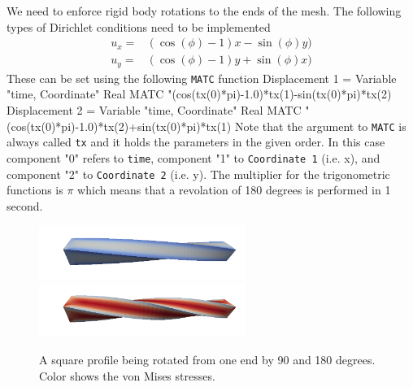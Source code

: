 We need to enforce rigid body rotations to the ends of the mesh. The following
types of Dirichlet conditions need to be implemented
\begin{equation}
  \begin{array}{ll}
    u_x = & ( \cos(\phi) - 1)x - \sin(\phi)y ) \\
    u_y = & ( \cos(\phi) - 1)y + \sin(\phi)x )     
  \end{array}
\end{equation}
These can be set using the following \texttt{MATC} function
\ttbegin
  Displacement 1 = Variable "time, Coordinate"
    Real MATC "(cos(tx(0)*pi)-1.0)*tx(1)-sin(tx(0)*pi)*tx(2)
  Displacement 2 = Variable "time, Coordinate"
    Real MATC "(cos(tx(0)*pi)-1.0)*tx(2)+sin(tx(0)*pi)*tx(1)
\ttend 
Note that the argument to \texttt{MATC} is always called \texttt{tx} and it holds the
parameters in the given order. In this case component "0" refers to \texttt{time}, component "1" to
\texttt{Coordinate 1} (i.e. x), and component "2" to \texttt{Coordinate 2} (i.e. y). 
The multiplier for the trigonometric functions is $\pi$ which means that a revolation of
180 degrees is performed in 1 second. 
 
\begin{figure}[h!]
\begin{center}
  \includegraphics[width=0.6\textwidth]{RotatingProfile50}
  \includegraphics[width=0.6\textwidth]{RotatingProfile100}
  \caption{A square profile being rotated from one end by 90 and 180 degrees. Color shows the von Mises stresses.}
  \label{fig:RotatingProfile}
\end{center}
\end{figure}



\vfill
\mbox{}
